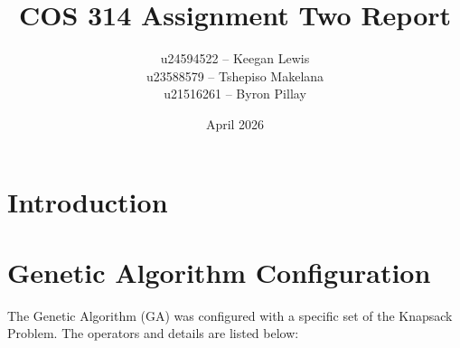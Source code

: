 \documentclass{article}
\begin{document}
\title{COS 314 Assignment Two Report}
\author{u24594522 -- Keegan Lewis \\
u23588579 -- Tshepiso Makelana \\
u21516261 -- Byron Pillay}
\date{April 2026}
\maketitle

\section{Introduction}

\section{Genetic Algorithm Configuration}

The Genetic Algorithm (GA) was configured with a specific set of the Knapsack Problem. The operators and details are listed below:
\end{document}
